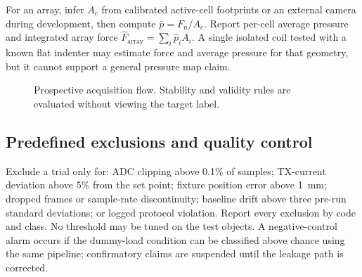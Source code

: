 \documentclass[10pt]{article}
\begin{document}
For an array, infer $A_c$ from calibrated active-cell footprints or an external camera during development, then compute $\bar p=F_n/A_c$. Report per-cell average pressure and integrated array force $\hat F_{\mathrm{array}}=\sum_i\hat p_iA_i$. A single isolated coil tested with a known flat indenter may estimate force and average pressure for that geometry, but it cannot support a general pressure map claim.

\begin{figure}[t]
\centering
{}
\caption{Prospective acquisition flow. Stability and validity rules are evaluated without viewing the target label.}
\label{fig:protocol}
\end{figure}

\subsection{Predefined exclusions and quality control}
Exclude a trial only for: ADC clipping above 0.1\% of samples; TX-current deviation above 5\% from the set point; fixture position error above \SI{1}{\milli\metre}; dropped frames or sample-rate discontinuity; baseline drift above three pre-run standard deviations; or logged protocol violation. Report every exclusion by code and class. No threshold may be tuned on the test objects. A negative-control alarm occurs if the dummy-load condition can be classified above chance using the same pipeline; confirmatory claims are suspended until the leakage path is corrected.
\end{document}
